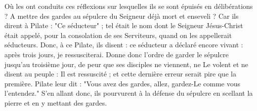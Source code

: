 Où les ont conduits ces réflexions sur lesquelles ils se sont épuisés en délibérations ? A mettre des gardes au sépulcre du Seigneur déjà mort et enseveli ? Car ils dirent à Pilate : "Ce séducteur" ; tel était le nom dont le Seigneur Jésus-Christ était appelé, pour la consolation de ses Serviteurs, quand on les appellerait séducteurs. Donc, à ce Pilate, ils disent : ce séducteur a déclaré encore vivant : après trois jours, je ressusciterai. Donne donc l'ordre de garder le sépulcre jusqu'au troisième jour, de peur que ses disciples ne viennent, ne Le volent et ne disent au peuple : Il est ressuscité ; et cette dernière erreur serait pire que la première. Pilate leur dit : "Vous avez des gardes, allez, gardez-Le comme vous l'entendez." S'en allant donc, ils pourvurent à la défense du sépulcre en scellant la pierre et en y mettant des gardes.